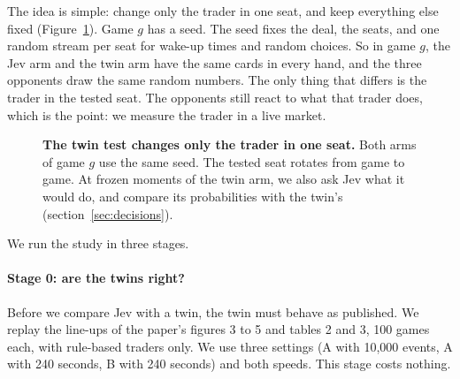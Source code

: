 \documentclass[10pt]{article}
\begin{document}
The idea is simple: change only the trader in one seat, and keep everything else fixed (Figure~\ref{fig:design}).
Game $g$ has a seed. The seed fixes the deal, the seats, and one random stream per seat for wake-up times and random
choices. So in game $g$, the Jev arm and the twin arm have the same cards in every hand, and the three opponents draw
the same random numbers. The only thing that differs is the trader in the tested seat. The opponents still react to
what that trader does, which is the point: we measure the trader in a live market.

\begin{figure}[t]
\centering
{}
\caption{\textbf{The twin test changes only the trader in one seat.} Both arms of game $g$ use the same seed. The
tested seat rotates from game to game. At frozen moments of the twin arm, we also ask Jev what it would do, and
compare its probabilities with the twin's (section~\ref{sec:decisions}).}
\label{fig:design}
\end{figure}

We run the study in three stages.

\paragraph{Stage 0: are the twins right?} Before we compare Jev with a twin, the twin must behave as published. We
replay the line-ups of the paper's figures 3 to 5 and tables 2 and 3, 100 games each, with rule-based traders only. We
use three settings (A with 10,000 events, A with 240 seconds, B with 240 seconds) and both speeds. This stage costs
nothing.
\end{document}
